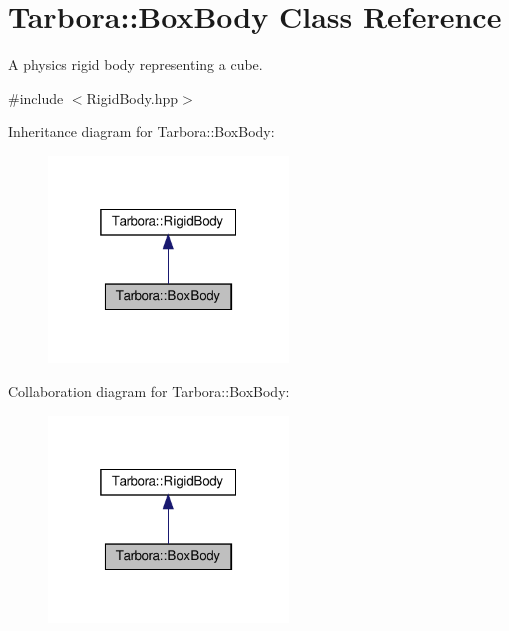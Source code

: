 \hypertarget{classTarbora_1_1BoxBody}{}\section{Tarbora\+:\+:Box\+Body Class Reference}
\label{classTarbora_1_1BoxBody}


A physics rigid body representing a cube.  




{\ttfamily \#include $<$Rigid\+Body.\+hpp$>$}



Inheritance diagram for Tarbora\+:\+:Box\+Body\+:
\nopagebreak
\begin{figure}[H]
\begin{center}
\leavevmode
\includegraphics[width=181pt]{classTarbora_1_1BoxBody__inherit__graph}
\end{center}
\end{figure}


Collaboration diagram for Tarbora\+:\+:Box\+Body\+:
\nopagebreak
\begin{figure}[H]
\begin{center}
\leavevmode
\includegraphics[width=181pt]{classTarbora_1_1BoxBody__coll__graph}
\end{center}
\end{figure}
